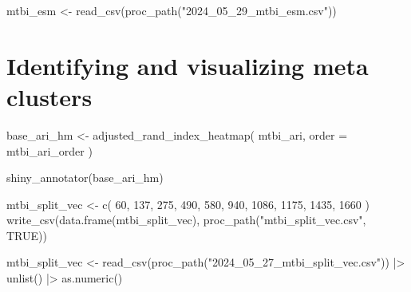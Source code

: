 \documentclass[
  letterpaper,
  DIV=11,
  numbers=noendperiod]{scrreprt}
\newenvironment{Shaded}{\begin{snugshade}}{\end{snugshade}}
\newcommand{\AttributeTok}[1]{\textcolor[rgb]{0.40,0.45,0.13}{#1}}
\newcommand{\ConstantTok}[1]{\textcolor[rgb]{0.56,0.35,0.01}{#1}}
\newcommand{\DecValTok}[1]{\textcolor[rgb]{0.68,0.00,0.00}{#1}}
\newcommand{\FunctionTok}[1]{\textcolor[rgb]{0.28,0.35,0.67}{#1}}
\newcommand{\NormalTok}[1]{\textcolor[rgb]{0.00,0.23,0.31}{#1}}
\newcommand{\OtherTok}[1]{\textcolor[rgb]{0.00,0.23,0.31}{#1}}
\newcommand{\SpecialCharTok}[1]{\textcolor[rgb]{0.37,0.37,0.37}{#1}}
\newcommand{\StringTok}[1]{\textcolor[rgb]{0.13,0.47,0.30}{#1}}
\begin{document}
\begin{Shaded}
\begin{Highlighting}[]
\NormalTok{mtbi\_esm }\OtherTok{\textless{}{-}} \FunctionTok{read\_csv}\NormalTok{(}\FunctionTok{proc\_path}\NormalTok{(}\StringTok{"2024\_05\_29\_mtbi\_esm.csv"}\NormalTok{))}
\end{Highlighting}
\end{Shaded}

\section{Identifying and visualizing meta
clusters}\label{identifying-and-visualizing-meta-clusters}

\begin{Shaded}
\begin{Highlighting}[]
\NormalTok{base\_ari\_hm }\OtherTok{\textless{}{-}} \FunctionTok{adjusted\_rand\_index\_heatmap}\NormalTok{(}
\NormalTok{    mtbi\_ari,}
    \AttributeTok{order =}\NormalTok{ mtbi\_ari\_order}
\NormalTok{)}

\FunctionTok{shiny\_annotator}\NormalTok{(base\_ari\_hm)}

\NormalTok{mtbi\_split\_vec }\OtherTok{\textless{}{-}} \FunctionTok{c}\NormalTok{(}
    \DecValTok{60}\NormalTok{,}
    \DecValTok{137}\NormalTok{,}
    \DecValTok{275}\NormalTok{,}
    \DecValTok{490}\NormalTok{,}
    \DecValTok{580}\NormalTok{,}
    \DecValTok{940}\NormalTok{,}
    \DecValTok{1086}\NormalTok{,}
    \DecValTok{1175}\NormalTok{,}
    \DecValTok{1435}\NormalTok{,}
    \DecValTok{1660}
\NormalTok{)}
\FunctionTok{write\_csv}\NormalTok{(}\FunctionTok{data.frame}\NormalTok{(mtbi\_split\_vec), }\FunctionTok{proc\_path}\NormalTok{(}\StringTok{"mtbi\_split\_vec.csv"}\NormalTok{, }\ConstantTok{TRUE}\NormalTok{))}
\end{Highlighting}
\end{Shaded}

\begin{Shaded}
\begin{Highlighting}[]
\NormalTok{mtbi\_split\_vec }\OtherTok{\textless{}{-}} \FunctionTok{read\_csv}\NormalTok{(}\FunctionTok{proc\_path}\NormalTok{(}\StringTok{"2024\_05\_27\_mtbi\_split\_vec.csv"}\NormalTok{)) }\SpecialCharTok{|\textgreater{}}
    \FunctionTok{unlist}\NormalTok{() }\SpecialCharTok{|\textgreater{}}
    \FunctionTok{as.numeric}\NormalTok{()}
\end{Highlighting}
\end{Shaded}
\end{document}
